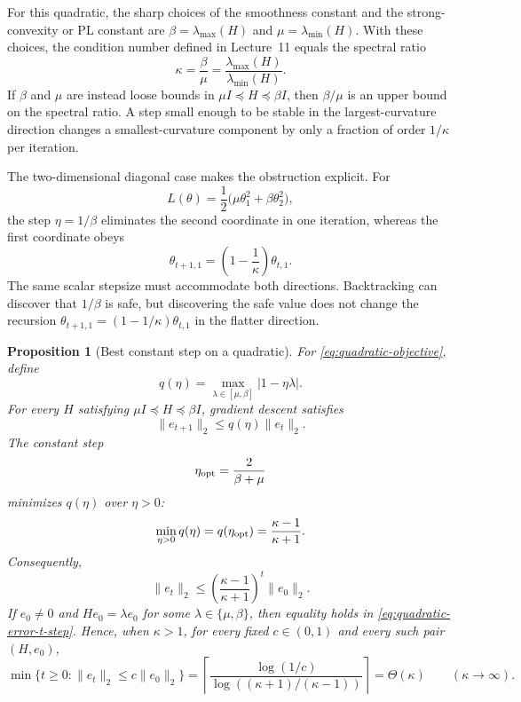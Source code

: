 \documentclass[11pt,twoside]{article}
\newtheorem{proposition}[theorem]{Proposition}
\theoremstyle{definition}
\theoremstyle{remark}
\begin{document}
For this quadratic, the sharp choices of the smoothness constant and the
strong-convexity or PL constant are $\beta=\lambda_{\max}(H)$ and
$\mu=\lambda_{\min}(H)$. With these choices, the condition number defined in
Lecture~11 equals the spectral ratio
\begin{equation}
 \kappa=\frac\beta\mu
 =\frac{\lambda_{\max}(H)}{\lambda_{\min}(H)}.
 \label{eq:condition-number}
\end{equation}
If $\beta$ and $\mu$ are instead loose bounds in
$\mu I\preceq H\preceq\beta I$, then $\beta/\mu$ is an upper bound on the
spectral ratio.
A step small enough to be stable in the largest-curvature direction changes
a smallest-curvature component by only a fraction of order $1/\kappa$ per
iteration.

The two-dimensional diagonal case makes the obstruction explicit. For
\[
 L(\theta)=\frac12\bigl(\mu\theta_1^2+\beta\theta_2^2\bigr),
\]
the step $\eta=1/\beta$ eliminates the second coordinate in one iteration,
whereas the first coordinate obeys
\[
 \theta_{t+1,1}=\left(1-\frac1\kappa\right)\theta_{t,1}.
\]
The same scalar stepsize must accommodate both directions. Backtracking can
discover that $1/\beta$ is safe, but discovering the safe value does not
change the recursion
$\theta_{t+1,1}=(1-1/\kappa)\theta_{t,1}$ in the flatter direction.

\begin{proposition}[Best constant step on a quadratic]
\label{prop:best-constant-step}
For \cref{eq:quadratic-objective}, define
\begin{equation}
 q(\eta)=\max_{\lambda\in[\mu,\beta]}|1-\eta\lambda|.
 \label{eq:quadratic-uniform-contraction}
\end{equation}
For every $H$ satisfying $\mu I\preceq H\preceq\beta I$, gradient descent
satisfies
\begin{equation}
 \|e_{t+1}\|_2\le q(\eta)\|e_t\|_2.
 \label{eq:quadratic-error-one-step}
\end{equation}
The constant step
\begin{equation}
 \eta_{\rm opt}=\frac{2}{\beta+\mu}
 \label{eq:optimal-quadratic-step}
\end{equation}
minimizes $q(\eta)$ over $\eta>0$:
\begin{equation}
 \min_{\eta>0}q(\eta)
 =q(\eta_{\rm opt})
 =\frac{\kappa-1}{\kappa+1}.
 \label{eq:gd-spectral-factor}
\end{equation}
Consequently,
\begin{equation}
 \|e_t\|_2
 \le\left(\frac{\kappa-1}{\kappa+1}\right)^t\|e_0\|_2.
 \label{eq:quadratic-error-t-step}
\end{equation}
If $e_0\ne0$ and $He_0=\lambda e_0$ for some
$\lambda\in\{\mu,\beta\}$, then equality holds in
\cref{eq:quadratic-error-t-step}. Hence, when $\kappa>1$, for every fixed
$c\in(0,1)$ and every such pair $(H,e_0)$,
\begin{equation}
 \min\{t\ge0:\|e_t\|_2\le c\|e_0\|_2\}
 =\left\lceil
   \frac{\log(1/c)}{\log((\kappa+1)/(\kappa-1))}
  \right\rceil
 =\Theta(\kappa)
 \qquad(\kappa\to\infty).
 \label{eq:quadratic-fixed-reduction}
\end{equation}
\end{proposition}
\end{document}
